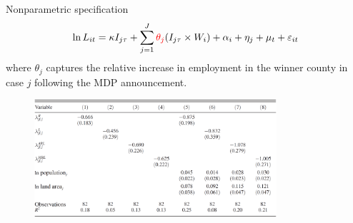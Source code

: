 \documentclass{beamer}
\begin{document}
\begin{frame}{Nonparametric specification}
	\begin{equation}
		\ln L_{it} = \kappa I_{j\tau} + \sum_{j=1}^{J}\textcolor{red}{\theta_j}(I_{j\tau}\times W_i) + \alpha_i + \eta_j + \mu_{t} + \varepsilon_{it}
	\end{equation}
	where $\theta_j$ captures the relative increase in employment in the winner county in case $j$ following the MDP announcement.
	\begin{figure}[htbp]
		\centering
		\includegraphics[width=0.8\textwidth]{tab4.png}
	\end{figure}
\end{frame}
\end{document}
